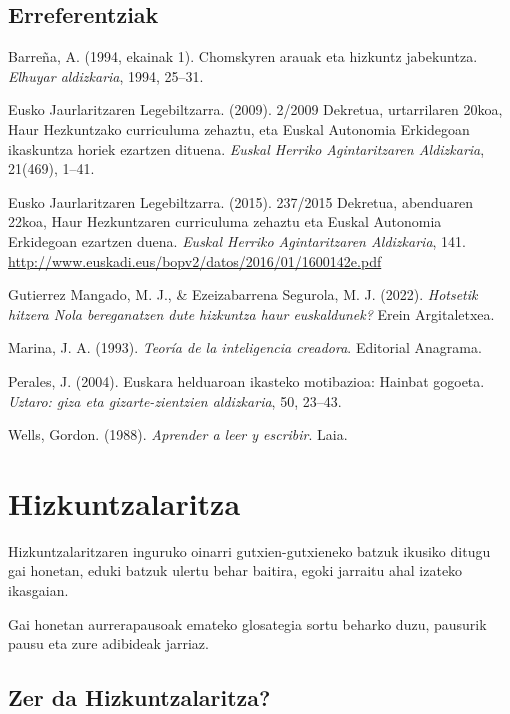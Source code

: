 \documentclass[
]{book}
\begin{document}
\hypertarget{T1E}{%
\section*{Erreferentziak}\label{T1E}}

Barreña, A. (1994, ekainak 1). Chomskyren arauak eta hizkuntz jabekuntza. \emph{Elhuyar aldizkaria}, 1994, 25--31.

Eusko Jaurlaritzaren Legebiltzarra. (2009). 2/2009 Dekretua, urtarrilaren 20koa, Haur Hezkuntzako curriculuma zehaztu, eta Euskal Autonomia Erkidegoan ikaskuntza horiek ezartzen dituena. \emph{Euskal Herriko Agintaritzaren Aldizkaria}, 21(469), 1--41.

Eusko Jaurlaritzaren Legebiltzarra. (2015). 237/2015 Dekretua, abenduaren 22koa, Haur Hezkuntzaren curriculuma zehaztu eta Euskal Autonomia Erkidegoan ezartzen duena. \emph{Euskal Herriko Agintaritzaren Aldizkaria}, 141. \url{http://www.euskadi.eus/bopv2/datos/2016/01/1600142e.pdf}

Gutierrez Mangado, M. J., \& Ezeizabarrena Segurola, M. J. (2022). \emph{Hotsetik hitzera Nola bereganatzen dute hizkuntza haur euskaldunek?} Erein Argitaletxea.

Marina, J. A. (1993). \emph{Teoría de la inteligencia creadora}. Editorial Anagrama.

Perales, J. (2004). Euskara helduaroan ikasteko motibazioa: Hainbat gogoeta. \emph{Uztaro: giza eta gizarte-zientzien aldizkaria}, 50, 23--43.

Wells, Gordon. (1988). \emph{Aprender a leer y escribir}. Laia.

\hypertarget{hizkuntzalaritza}{%
\chapter{Hizkuntzalaritza}\label{hizkuntzalaritza}}

Hizkuntzalaritzaren inguruko oinarri gutxien-gutxieneko batzuk ikusiko ditugu gai honetan, eduki batzuk ulertu behar baitira, egoki jarraitu ahal izateko ikasgaian.

Gai honetan aurrerapausoak emateko glosategia sortu beharko duzu, pausurik pausu eta zure adibideak jarriaz.

\hypertarget{zer-da-hizkuntzalaritza}{%
\section{Zer da Hizkuntzalaritza?}\label{zer-da-hizkuntzalaritza}}
\end{document}
